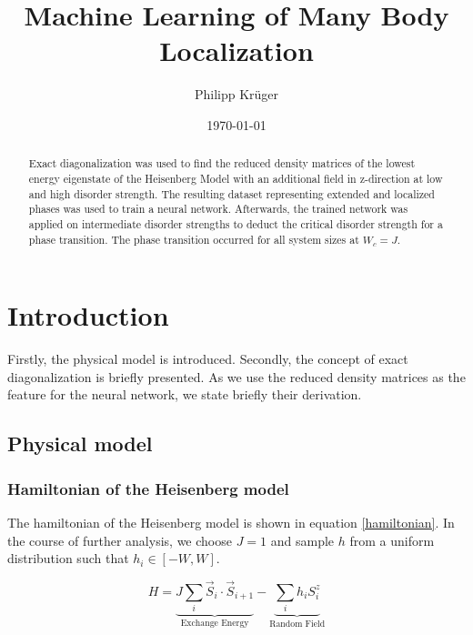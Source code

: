 \documentclass[reprint,amsmath,amssymb,aps,prb]{revtex4-2}
\begin{document}
%

\title{Machine Learning of Many Body Localization}

\author{Philipp Krüger}

\date{\today}%

\begin{abstract}
Exact diagonalization was used to find the reduced density matrices of the lowest energy eigenstate of the Heisenberg Model with an additional field in z-direction at low and high disorder strength. The resulting dataset representing extended and localized phases was used to train a neural network. Afterwards, the trained network was applied on intermediate disorder strengths to deduct the critical disorder strength for a phase transition. The phase transition occurred for all system sizes at $W_c = J$. 
\end{abstract}

\maketitle

\section{Introduction}

Firstly, the physical model is introduced. Secondly, the concept of exact diagonalization is briefly presented. As we use the reduced density matrices as the feature for the neural network, we state briefly their derivation.
\subsection{Physical model}

\subsubsection{Hamiltonian of the Heisenberg model}

The hamiltonian of the Heisenberg model is shown in equation \ref{hamiltonian}. In the course of further analysis, we choose $J=1$ and sample $h$ from a uniform distribution such that $h_i \in \left[-W, W\right]$.

\begin{equation}
	H=\underbrace{J\sum_i \vec{S}_i\cdot\vec{S}_{i+1}}_{\text{Exchange Energy}}-\underbrace{\sum_ih_iS_i^z}_{\text{Random Field}}\label{hamiltonian}
\end{equation}
\end{document}
